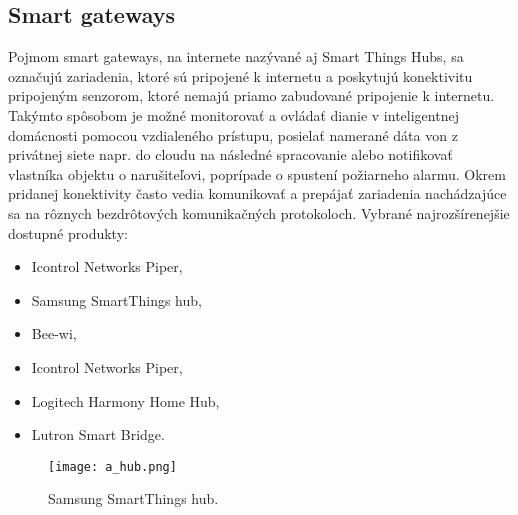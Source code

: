 \documentclass[12pt,a4paper,oneside,openright]{report}
\begin{document}
\subsection{Smart gateways} \label{s_smarthubs}
Pojmom smart gateways, na internete nazývané aj Smart Things Hubs, sa označujú zariadenia, ktoré sú pripojené k internetu a poskytujú konektivitu pripojeným senzorom, ktoré nemajú priamo zabudované pripojenie k internetu. Takýmto spôsobom je možné monitorovať a ovládať dianie v inteligentnej domácnosti pomocou vzdialeného prístupu, posielať namerané dáta von z privátnej siete napr. do cloudu na následné spracovanie alebo notifikovať vlastníka objektu o narušiteľovi, poprípade o spustení požiarneho alarmu. Okrem pridanej konektivity často vedia komunikovať a prepájať zariadenia nachádzajúce sa na rôznych bezdrôtových komunikačných protokoloch.
Vybrané najrozšírenejšie dostupné produkty:
\begin{itemize}
	\item Icontrol Networks Piper,
	\item Samsung SmartThings hub,
	\item Bee-wi,
	\item Icontrol Networks Piper,
	\item Logitech Harmony Home Hub,
	\item Lutron Smart Bridge.
\end{itemize}
\onehalfspacing

\begin{figure*}[h]
	\centering
	\texttt{[image: a\_hub.png]}
	\caption{Samsung SmartThings hub.\cite{hub}}
	\label{f:o_hub}
\end{figure*}
\end{document}
